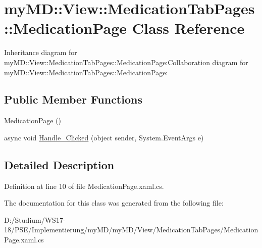 \hypertarget{classmy_m_d_1_1_view_1_1_medication_tab_pages_1_1_medication_page}{
\section{my\-MD::View::Medication\-Tab\-Pages::Medication\-Page Class Reference}
\label{dc/d59/classmy_m_d_1_1_view_1_1_medication_tab_pages_1_1_medication_page}
}
Inheritance diagram for my\-MD::View::Medication\-Tab\-Pages::Medication\-Page:Collaboration diagram for my\-MD::View::Medication\-Tab\-Pages::Medication\-Page:\subsection*{Public Member Functions}
\begin{CompactItemize}
\item 
\hypertarget{classmy_m_d_1_1_view_1_1_medication_tab_pages_1_1_medication_page_7ab0829cfec15072585d75555078c642}{
\hyperlink{classmy_m_d_1_1_view_1_1_medication_tab_pages_1_1_medication_page_7ab0829cfec15072585d75555078c642}{Medication\-Page} ()}
\label{dc/d59/classmy_m_d_1_1_view_1_1_medication_tab_pages_1_1_medication_page_7ab0829cfec15072585d75555078c642}

\item 
\hypertarget{classmy_m_d_1_1_view_1_1_medication_tab_pages_1_1_medication_page_e71819ec8b500664219a9fda633ff652}{
async void \hyperlink{classmy_m_d_1_1_view_1_1_medication_tab_pages_1_1_medication_page_e71819ec8b500664219a9fda633ff652}{Handle\_\-Clicked} (object sender, System.Event\-Args e)}
\label{dc/d59/classmy_m_d_1_1_view_1_1_medication_tab_pages_1_1_medication_page_e71819ec8b500664219a9fda633ff652}

\end{CompactItemize}


\subsection{Detailed Description}




Definition at line 10 of file Medication\-Page.xaml.cs.

The documentation for this class was generated from the following file:\begin{CompactItemize}
\item 
D:/Studium/WS17-18/PSE/Implementierung/my\-MD/my\-MD/View/Medication\-Tab\-Pages/Medication\-Page.xaml.cs\end{CompactItemize}
